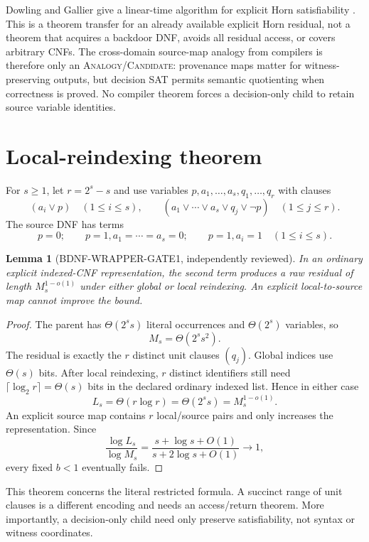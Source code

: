 \documentclass[11pt]{article}
\newtheorem{lemma}{Lemma}
\begin{document}
Dowling and Gallier give a linear-time algorithm for explicit Horn
satisfiability \cite{dowling1984horn}.  This is a theorem transfer for an
already available explicit Horn residual, not a theorem that acquires a
backdoor DNF, avoids all residual access, or covers arbitrary CNFs.
The cross-domain source-map analogy from compilers is therefore only an
\textsc{Analogy/Candidate}: provenance maps matter for witness-preserving
outputs, but decision SAT permits semantic quotienting when correctness is
proved.  No compiler theorem forces a decision-only child to retain source
variable identities.

\section{Local-reindexing theorem}
For $s\ge1$, let $r=2^s-s$ and use variables
$p,a_1,\ldots,a_s,q_1,\ldots,q_r$ with clauses
\[
 (a_i\vee p)\quad(1\le i\le s),\qquad
 (a_1\vee\cdots\vee a_s\vee q_j\vee\neg p)
 \quad(1\le j\le r).
\]
The source DNF has terms
\[
 p=0;\qquad p=1,a_1=\cdots=a_s=0;\qquad
 p=1,a_i=1\quad(1\le i\le s).
\]

\begin{lemma}[BDNF-WRAPPER-GATE1, independently reviewed]
In an ordinary explicit indexed-CNF representation, the second term produces
a raw residual of length $M_s^{1-o(1)}$ under either global or local
reindexing.  An explicit local-to-source map cannot improve the bound.
\end{lemma}
\begin{proof}
The parent has $\Theta(2^s s)$ literal occurrences and
$\Theta(2^s)$ variables, so
\[
 M_s=\Theta(2^s s^2).
\]
The residual is exactly the $r$ distinct unit clauses $(q_j)$.  Global
indices use $\Theta(s)$ bits.  After local reindexing, $r$ distinct
identifiers still need $\lceil\log_2 r\rceil=\Theta(s)$ bits in the
declared ordinary indexed list.  Hence in either case
\[
 L_s=\Theta(r\log r)=\Theta(2^s s)
     =M_s^{1-o(1)}.
\]
An explicit source map contains $r$ local/source pairs and only increases
the representation.  Since
\[
 \frac{\log L_s}{\log M_s}
 =\frac{s+\log s+O(1)}{s+2\log s+O(1)}\longrightarrow1,
\]
every fixed $b<1$ eventually fails.
\end{proof}

This theorem concerns the literal restricted formula.  A succinct range of
unit clauses is a different encoding and needs an access/return theorem.
More importantly, a decision-only child need only preserve satisfiability,
not syntax or witness coordinates.
\end{document}
